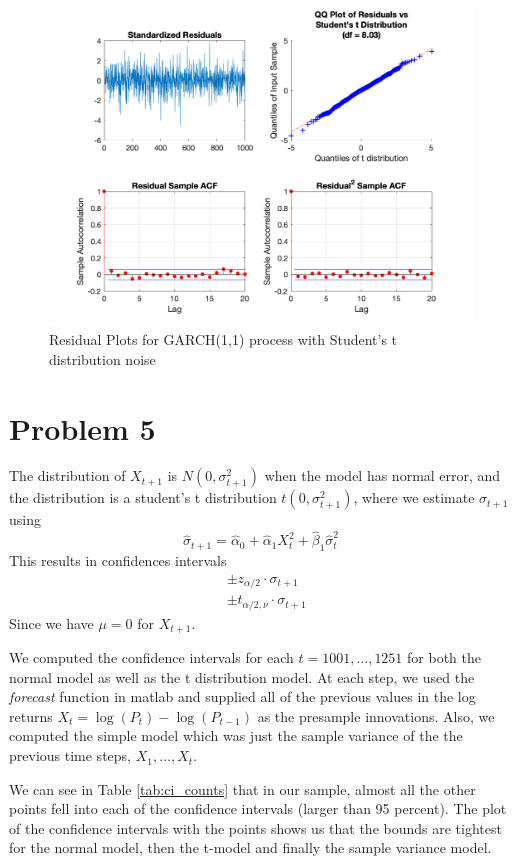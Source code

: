 \documentclass{article}
\begin{document}
\begin{figure}[H]
\includegraphics[width=16cm]{plots/residual_plots_t.png}
\centering
\caption{Residual Plots for GARCH(1,1) process with Student's t distribution noise}
\label{fig:residual_plots_t}
\end{figure}

\section*{Problem 5}
The distribution of $X_{t + 1}$ is $N(0, \sigma_{t+1}^2)$ when the model has normal error,
and the distribution is a student's t distribution $t(0, \sigma_{t + 1}^2)$,
where we estimate $\sigma_{t + 1}$ using
$$
\hat{\sigma}_{t + 1} = \hat{\alpha}_0 + \hat{\alpha}_1 X_t^2 + \hat{\beta}_1 \hat{\sigma}_t^2
$$
This results in confidences intervals
\begin{align*}
&\pm z_{\alpha/2} \cdot \sigma_{t + 1}\\
&\pm t_{\alpha/2, \nu} \cdot \sigma_{t + 1}
\end{align*}
Since we have $\mu = 0$ for $X_{t + 1}$.

We computed the confidence intervals for each $t = 1001,\ldots, 1251$ for both the normal model as well as the t distribution model.
At each step, we used the \textit{forecast} function in matlab and supplied all of the previous values in the log returns $X_t = \log(P_t) - \log(P_{t - 1})$ as the presample innovations.
Also, we computed the simple model which was just the sample variance of the the previous time steps, $X_1, \ldots, X_t$.

We can see in Table \ref{tab:ci_counts} that in our sample, almost all the other points fell into each of the confidence intervals (larger than 95 percent).
The plot of the confidence intervals with the points shows us that the bounds are tightest for the normal model, then the t-model and finally the sample variance model.
\end{document}

